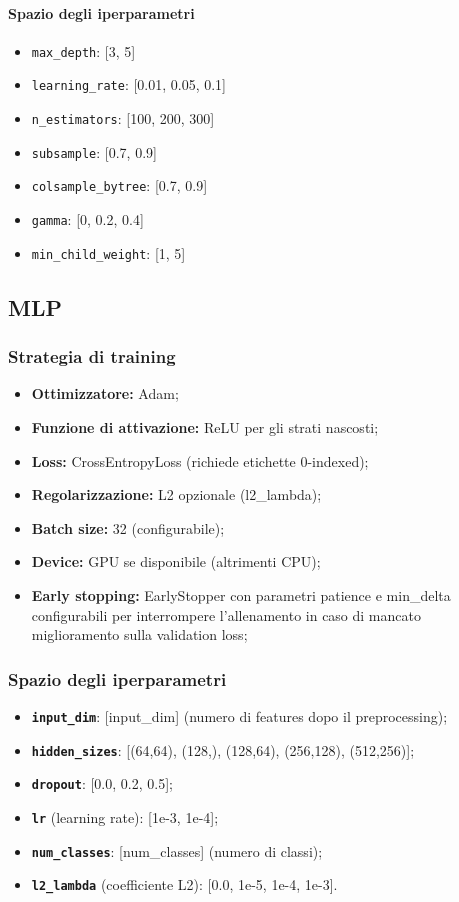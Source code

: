 \documentclass[a4paper,12pt]{report}
\begin{document}
	\paragraph{Spazio degli iperparametri}
	\begin{itemize}
		\item \texttt{max\_depth}: [3, 5]
		\item \texttt{learning\_rate}: [0.01, 0.05, 0.1]
		\item \texttt{n\_estimators}: [100, 200, 300]
		\item \texttt{subsample}: [0.7, 0.9]
		\item \texttt{colsample\_bytree}: [0.7, 0.9]
		\item \texttt{gamma}: [0, 0.2, 0.4]
		\item \texttt{min\_child\_weight}: [1, 5]
	\end{itemize}
	
	\subsection{MLP}
	
	\subsubsection{Strategia di training}
	\begin{itemize}
		\item \textbf{Ottimizzatore:} Adam;
		\item \textbf{Funzione di attivazione:} ReLU per gli strati nascosti;
		\item \textbf{Loss:} CrossEntropyLoss (richiede etichette 0-indexed);
		\item \textbf{Regolarizzazione:} L2 opzionale (l2\_lambda);
		\item \textbf{Batch size:} 32 (configurabile);
		\item \textbf{Device:} GPU se disponibile (altrimenti CPU);
		\item \textbf{Early stopping:} EarlyStopper con parametri patience e min\_delta configurabili per interrompere l'allenamento in caso di mancato miglioramento sulla validation loss;
	\end{itemize}
	
	\subsubsection{Spazio degli iperparametri}
	\begin{itemize}
		\item \textbf{\texttt{input\_dim}}: [input\_dim] (numero di features dopo il preprocessing);
		\item \textbf{\texttt{hidden\_sizes}}: [(64,64), (128,), (128,64), (256,128), (512,256)];
		\item \textbf{\texttt{dropout}}: [0.0, 0.2, 0.5];
		\item \textbf{\texttt{lr}} (learning rate): [1e-3, 1e-4];
		\item \textbf{\texttt{num\_classes}}: [num\_classes] (numero di classi);
		\item \textbf{\texttt{l2\_lambda}} (coefficiente L2): [0.0, 1e-5, 1e-4, 1e-3].
	\end{itemize}
	
\end{document}

